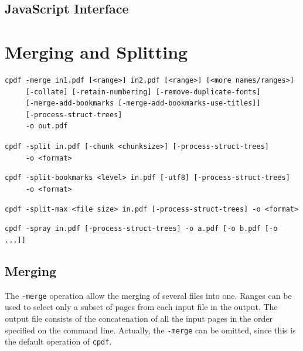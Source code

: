 \documentclass{book}
\newcommand{\cpdf}{\texttt{cpdf}}
\begin{document}
\begin{jscpdflib}
\clearpage
\section*{JavaScript Interface}
\begin{small}\tt




\end{small}
\end{jscpdflib}

\chapter{Merging and Splitting}\label{chap:2}
  \begin{framed}
  \small
  \noindent\begin{verbatim}
cpdf -merge in1.pdf [<range>] in2.pdf [<range>] [<more names/ranges>]
     [-collate] [-retain-numbering] [-remove-duplicate-fonts]
     [-merge-add-bookmarks [-merge-add-bookmarks-use-titles]]
     [-process-struct-trees]
     -o out.pdf\end{verbatim}

  \vspace{1.5mm}
  \noindent\verb!cpdf -split in.pdf [-chunk <chunksize>] [-process-struct-trees]!\\
  \noindent\verb!     -o <format>!

  \vspace{1.5mm}
  \noindent\verb!cpdf -split-bookmarks <level> in.pdf [-utf8] [-process-struct-trees]!\\
  \noindent\verb!     -o <format>!

  \vspace{1.5mm}
  \noindent\verb!cpdf -split-max <file size> in.pdf [-process-struct-trees] -o <format>!

  \vspace{1.5mm}
  \noindent\verb!cpdf -spray in.pdf [-process-struct-trees] -o a.pdf [-o b.pdf [-o ...]]!
  \end{framed}

  \vspace{12mm}
  \section{Merging}
  The \texttt{-merge} operation allow the merging of several files into one.
Ranges can be used to select only a subset of pages from each
input file in the output. The output file consists of the concatenation of all
the input pages in the order specified on the command line. Actually, the
\texttt{-merge} can be omitted, since this is the default operation of \cpdf.
\end{document}
